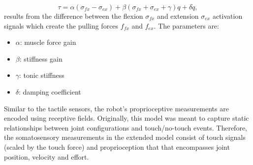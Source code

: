 \begin{equation}\label{eq:antagonistic_torque}
	\tau = \alpha \left(\sigma_{fx} - \sigma_{ex}\right)  + \beta \left(\sigma_{fx} + \sigma_{ex} + \gamma \right) q + \delta \dot{q},
\end{equation}
results from the difference between the flexion $ \sigma_{fx} $ and  extension $\sigma_{ex}$ activation signals which create the pulling forces $ f_{fx}$ and $f_{ex} $. The parameters are:
\begin{itemize}
	\item $\alpha$: muscle force gain
	\item $\beta$: stiffness gain
	\item $\gamma$: tonic stiffness	
	\item $\delta$: damping coefficient
\end{itemize}

Similar to the tactile sensors, the robot's proprioceptive measurements are encoded using receptive fields. Originally, this model was meant to capture static relationships between joint configurations and touch/no-touch events. Therefore, the somatosensory measurements in the extended model consist of touch signals (scaled by the touch force) and proprioception that that encompasses joint position, velocity and effort.

